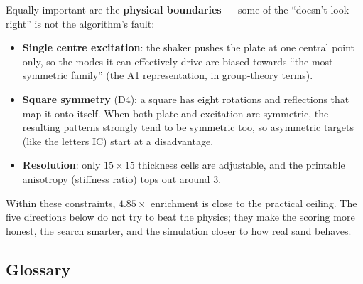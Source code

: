 \documentclass[11pt,a4paper]{article}
\begin{document}
Equally important are the \textbf{physical boundaries} --- some of the ``doesn't look right'' is not the algorithm's fault:

\begin{itemize}[leftmargin=2em]
\item \textbf{Single centre excitation}: the shaker pushes the plate at one central point only, so the modes it can effectively drive are biased towards ``the most symmetric family'' (the A1 representation, in group-theory terms).
\item \textbf{Square symmetry} (D4): a square has eight rotations and reflections that map it onto itself. When both plate and excitation are symmetric, the resulting patterns strongly tend to be symmetric too, so asymmetric targets (like the letters IC) start at a disadvantage.
\item \textbf{Resolution}: only $15\times 15$ thickness cells are adjustable, and the printable anisotropy (stiffness ratio) tops out around 3.
\end{itemize}

Within these constraints, $4.85\times$ enrichment is close to the practical ceiling. The five directions below do not try to beat the physics; they make the scoring more honest, the search smarter, and the simulation closer to how real sand behaves.

\subsection*{Glossary}
\end{document}
